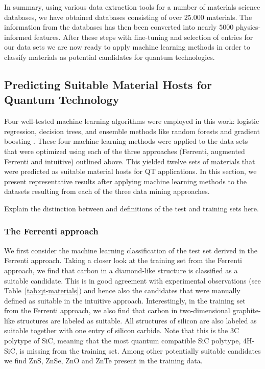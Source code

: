 \documentclass[superscriptaddress,unsortedaddress,
 amsmath,amssymb,
 aps,
]{revtex4-2}
\begin{document}
In summary, using various
data extraction tools for a number of materials science databases, we have obtained databases consisting of over $25.000$ materials. The information from the databases has then been converted into nearly $5000$ physics-informed features. 
After these steps with fine-tuning and selection of entries for our data sets we are now ready to apply machine learning methods in order to classify materials as potential candidates for quantum technologies. 

\subsection*{Predicting Suitable Material Hosts for Quantum Technology} 
Four well-tested machine learning algorithms were employed in this work: logistic regression, decision trees, and ensemble methods like random forests and gradient boosting \cite{Mehta2019,Hastie2009}. 
These four machine learning methods were applied to the data sets that were optimized using each of the three approaches (Ferrenti, augmented Ferrenti and intuitive) outlined above. This yielded twelve sets of materials that were predicted as suitable material hosts for QT applications. In this section, we present representative results after applying machine learning methods to the datasets resulting from each of the three data mining approaches. 

Explain the distinction between and definitions of the test and training sets here. 

\subsubsection*{The Ferrenti approach}
We first consider the machine learning classification of the test set derived in the Ferrenti approach. 
Taking a closer look at the training set from the Ferrenti approach, we find that carbon in a diamond-like structure is classified as a suitable candidate. 
This is in good agreement with experimental observations (see Table~\ref{tab:qt-materials}) and hence also the candidates that were manually defined as suitable in the intuitive approach.  
Interestingly, in the training set from the Ferrenti approach, we also find that carbon in two-dimensional graphite-like structures are labeled as suitable. 
All structures of silicon are also labeled as suitable together with one entry of silicon carbide. Note that this is the 3C polytype of SiC, meaning that the most quantum compatible SiC polytype, 4H-SiC, is missing from the training set. Among other potentially suitable candidates we find ZnS, ZnSe, ZnO and ZnTe present in the training data. 
\end{document}
